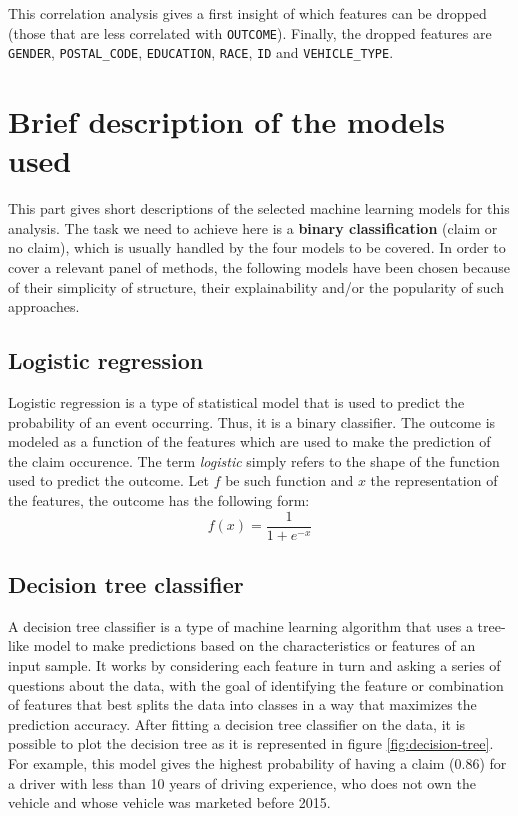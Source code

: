\documentclass[a4paper,11pt, titlepage]{article}
\begin{document}
\noindent This correlation analysis gives a first insight of which features can be dropped (those that are less correlated with {\tt OUTCOME}). Finally, the dropped features are {\tt GENDER}, {\tt POSTAL\_CODE}, {\tt EDUCATION}, {\tt RACE}, {\tt ID} and {\tt VEHICLE\_TYPE}.


\section{Brief description of the models used} \label{models}

This part gives short descriptions of the selected machine learning models for this analysis. The task we need to achieve here is a \textbf{binary classification} (claim or no claim), which is usually handled by the four models to be covered. In order to cover a relevant panel of methods, the following models have been chosen because of their simplicity of structure, their explainability and/or the popularity of such approaches.

\subsection{Logistic regression}

Logistic regression is a type of statistical model that is used to predict the probability of an event occurring. Thus, it is a binary classifier. The outcome is modeled as a function of the features which are used to make the prediction of the claim occurence. The term \textsl{logistic} simply refers to the shape of the function used to predict the outcome. Let $f$ be such function and $x$ the representation of the features, the outcome has the following form:
\begin{equation*}
    f(x) = \dfrac{1}{1+e^{-x}}
\end{equation*}

\subsection{Decision tree classifier}

A decision tree classifier is a type of machine learning algorithm that uses a tree-like model to make predictions based on the characteristics or features of an input sample. It works by considering each feature in turn and asking a series of questions about the data, with the goal of identifying the feature or combination of features that best splits the data into classes in a way that maximizes the prediction accuracy. After fitting a decision tree classifier on the data, it is possible to plot the decision tree as it is represented in figure \ref{fig:decision-tree}. For example, this model gives the highest probability of having a claim (0.86) for a driver with less than 10 years of driving experience, who does not own the vehicle and whose vehicle was marketed before 2015.
\end{document}
